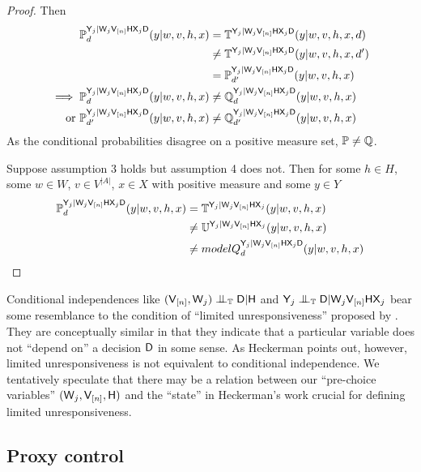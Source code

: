 \begin{proof}
Then
\begin{align}
    \mathbb{P}_d^{\mathsf{Y}_j|\mathsf{W}_j\mathsf{V}_{[n]}\mathsf{HX}_j\mathsf{D}}(y|w,v,h,x)&= \mathbb{T}^{\mathsf{Y}_j|\mathsf{W}_j\mathsf{V}_{[n]}\mathsf{HX}_j\mathsf{D}}(y|w,v,h,x,d)\\
    &\neq \mathbb{T}^{\mathsf{Y}_j|\mathsf{W}_j\mathsf{V}_{[n]}\mathsf{HX}_j\mathsf{D}}(y|w,v,h,x,d')\\
    &= \mathbb{P}_{d'}^{\mathsf{Y}_j|\mathsf{W}_j\mathsf{V}_{[n]}\mathsf{HX}_j\mathsf{D}}(y|w,v,h,x)\\
    \implies \mathbb{P}_d^{\mathsf{Y}_j|\mathsf{W}_j\mathsf{V}_{[n]}\mathsf{HX}_j\mathsf{D}}(y|w,v,h,x) &\neq \mathbb{Q}_d^{\mathsf{Y}_j|\mathsf{W}_j\mathsf{V}_{[n]}\mathsf{HX}_j\mathsf{D}}(y|w,v,h,x)\\
    \text{or } \mathbb{P}_{d'}^{\mathsf{Y}_j|\mathsf{W}_j\mathsf{V}_{[n]}\mathsf{HX}_j\mathsf{D}}(y|w,v,h,x) &\neq \mathbb{Q}_{d'}^{\mathsf{Y}_j|\mathsf{W}_j\mathsf{V}_{[n]}\mathsf{HX}_j\mathsf{D}}(y|w,v,h,x)
\end{align}
As the conditional probabilities disagree on a positive measure set, $\mathbb{P}\neq\mathbb{Q}$.

Suppose assumption 3 holds but assumption 4 does not. Then for some $h\in H$, some $w\in W$, $v\in V^{|A|}$, $x\in X$ with positive measure and some $y\in Y$
\begin{align}
    \mathbb{P}_d^{\mathsf{Y}_j|\mathsf{W}_j\mathsf{V}_{[n]}\mathsf{HX}_j\mathsf{D}}(y|w,v,h,x)&= \mathbb{T}^{\mathsf{Y}_j|\mathsf{W}_j\mathsf{V}_{[n]}\mathsf{HX}_j}(y|w,v,h,x)\\
    &\neq \mathbb{U}^{\mathsf{Y}_j|\mathsf{W}_j\mathsf{V}_{[n]}\mathsf{HX}_j}(y|w,v,h,x)\\
    &\neq model{Q}_d^{\mathsf{Y}_j|\mathsf{W}_j\mathsf{V}_{[n]}\mathsf{HX}_j\mathsf{D}}(y|w,v,h,x)
\end{align}
\end{proof}

Conditional independences like $(\RV{V}_{[n]},\RV{W}_j)\CI_{\model{T}} \RV{D}|\RV{H}$ and $\RV{Y}_j\CI_{\model{T}}\RV{D}|\RV{W}_j\RV{V}_{[n]}\RV{HX}_j$ bear some resemblance to the condition of ``limited unresponsiveness'' proposed by \citet{heckerman_decision-theoretic_1995}. They are conceptually similar in that they indicate that a particular variable does not ``depend on'' a decision $\mathsf{D}$ in some sense. As Heckerman points out, however, limited unresponsiveness is not equivalent to conditional independence. We tentatively speculate that there may be a relation between our ``pre-choice variables'' $(\mathsf{W}_j,\mathsf{V}_{[n]},\mathsf{H})$ and the ``state'' in Heckerman's work crucial for defining limited unresponsiveness.

\subsection{Proxy control}

